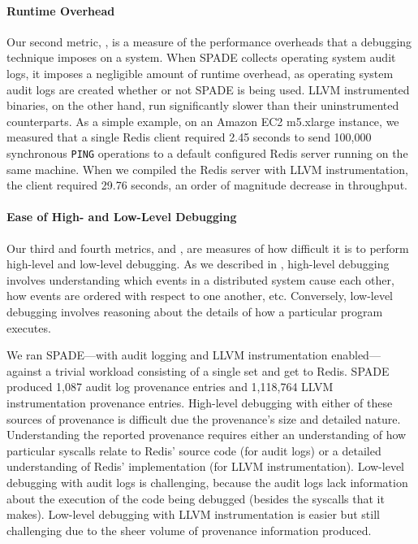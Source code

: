 \paragraph{Runtime Overhead}
Our second metric, , is a measure of the performance
overheads that a debugging technique imposes on a system.
%
When SPADE collects operating system audit logs, it imposes a negligible amount
of runtime overhead, as operating system audit logs are created whether or not
SPADE is being used. LLVM instrumented binaries, on the other hand, run
significantly slower than their uninstrumented counterparts. As a simple
example, on an Amazon EC2 m5.xlarge instance, we measured that a single Redis
client required 2.45 seconds to send 100,000 synchronous \texttt{PING}
operations to a default configured Redis server running on the same machine.
When we compiled the Redis server with LLVM instrumentation, the client
required 29.76 seconds, an order of magnitude decrease in throughput.

\paragraph{Ease of High- and Low-Level Debugging}
Our third and fourth metrics,  and
, are measures of how difficult it is to
perform high-level and low-level debugging. As we described in
, high-level debugging involves understanding which
events in a distributed system cause each other, how events are ordered with
respect to one another, etc. Conversely, low-level debugging involves reasoning
about the details of how a particular program executes.

We ran SPADE---with audit logging and LLVM instrumentation enabled---against a
trivial workload consisting of a single set and get to Redis. SPADE produced
1,087 audit log provenance entries and 1,118,764 LLVM instrumentation
provenance entries. High-level debugging with either of these sources of
provenance is difficult due the provenance's size and detailed nature.
Understanding the reported provenance requires either an understanding of how
particular syscalls relate to Redis' source code (for audit logs) or a detailed
understanding of Redis' implementation (for LLVM instrumentation). Low-level
debugging with audit logs is challenging, because the audit logs lack
information about the execution of the code being debugged (besides the
syscalls that it makes). Low-level debugging with LLVM instrumentation is easier
but still challenging due to the sheer volume of provenance information
produced.

